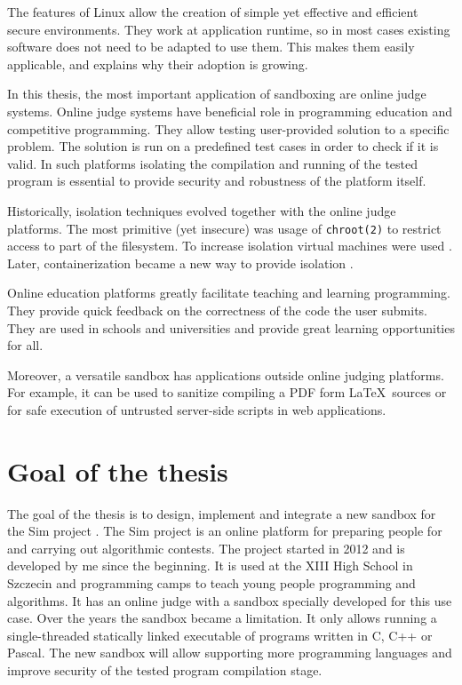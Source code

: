 \documentclass[en]{pracamgr}
\begin{document}
The features of Linux allow the creation of simple yet effective and efficient secure environments. They work at application runtime, so in most cases existing software does not need to be adapted to use them. This makes them easily applicable, and explains why their adoption is growing.

In this thesis, the most important application of sandboxing are online judge systems. Online judge systems have beneficial role in programming education and competitive programming. They allow testing user-provided solution to a specific problem. The solution is run on a predefined test cases in order to check if it is valid. In such platforms isolating the compilation and running of the tested program is essential to provide security and robustness of the platform itself.

Historically, isolation techniques evolved together with the online judge platforms. The most primitive (yet insecure) was usage of \texttt{chroot(2)} \cite{prevelakis2001sandboxing} to restrict access to part of the filesystem. To increase isolation virtual machines were used \cite{5635141}. Later, containerization became a new way to provide isolation \cite{marevs2012new, SPACEK20151665}.

Online education platforms greatly facilitate teaching and learning programming. They provide quick feedback on the correctness of the code the user submits. They are used in schools and universities and provide great learning opportunities for all.

Moreover, a versatile sandbox has applications outside online judging platforms. For example, it can be used to sanitize compiling a PDF form \LaTeX~sources or for safe execution of untrusted server-side scripts in web applications.

\section{Goal of the thesis}

The goal of the thesis is to design, implement and integrate a new sandbox for the Sim project \cite{sim_project}. The Sim project is an online platform for preparing people for and carrying out algorithmic contests. The project started in 2012 and is developed by me since the beginning. It is used at the XIII High School in Szczecin and programming camps to teach young people programming and algorithms. It has an online judge with a sandbox specially developed for this use case. Over the years the sandbox became a limitation. It only allows running a single-threaded statically linked executable of programs written in C, C++ or Pascal. The new sandbox will allow supporting more programming languages and improve security of the tested program compilation stage.
\end{document}
